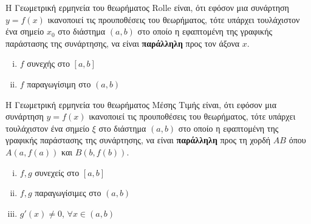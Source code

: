 \begin{rem}
  Η Γεωμετρική ερμηνεία του θεωρήματος Rolle είναι, ότι εφόσον μια συνάρτηση 
  $ y=f(x) $ ικανοποιεί τις προυποθέσεις του θεωρήματος, τότε υπάρχει τουλάχιστον ένα 
  σημείο $ x_{0} $ στο διάστημα $ (a,b) $ στο οποίο η εφαπτομένη της γραφικής παράστασης 
  της συνάρτησης, να είναι \textbf{παράλληλη} προς τον άξονα $x$.
\end{rem}


\begin{thmbreak} 
	\begin{minipage}[t]{4.6cm}
		\begin{enumerate}[i)]
			\item $f$ συνεχής στο $ [a,b] $ \hfill {}
			\item $f$ παραγωγίσιμη στο $ (a,b) $ \hfill {}
		\end{enumerate}
	\end{minipage}
\end{thmbreak}


\begin{rem}
  Η Γεωμετρική ερμηνεία του θεωρήματος Μέσης Τιμής είναι, ότι εφόσον μια συνάρτηση 
  $ y=f(x) $ ικανοποιεί τις προυποθέσεις του θεωρήματος, τότε υπάρχει τουλάχιστον ένα 
  σημείο $\xi$ στο διάστημα $ (a,b) $ στο οποίο η εφαπτομένη της γραφικής παράστασης 
  της συνάρτησης, να είναι \textbf{παράλληλη} προς τη χορδή $AB$ όπου $ A(a,f(a)) $ 
  και $ B(b,f(b)) $.
\end{rem}


\begin{thmbreak}
	\begin{minipage}[t]{5cm}
	\begin{enumerate}[i)]
		\item $f, g$ συνεχείς στο $ [a,b] $ \hfill {}
		\item $f, g$ παραγωγίσιμες στο $ (a,b) $
		\item $ g'(x) \neq 0 $, $ \forall x \in (a,b) $ \hfill {}
	\end{enumerate}	
	\end{minipage}
\end{thmbreak}

